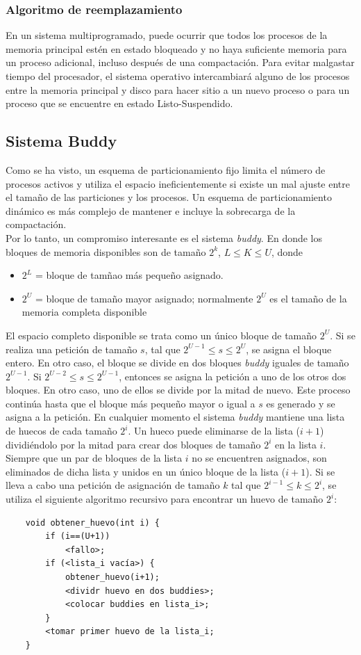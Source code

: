 \documentclass[12pt, a4paper]{article}
\begin{document}
\subsubsection{Algoritmo de reemplazamiento}
En un sistema multiprogramado, puede ocurrir que todos los procesos de la memoria principal estén en estado bloqueado y no haya suficiente memoria para un proceso adicional, incluso después de una compactación. Para evitar malgastar tiempo del procesador, el sistema operativo intercambiará alguno de los procesos entre la memoria principal y disco para hacer sitio a un nuevo proceso o para un proceso que se encuentre en estado Listo-Suspendido.
\subsection{Sistema Buddy}
Como se ha visto, un esquema de particionamiento fijo limita el número de procesos activos y utiliza el espacio ineficientemente si existe un mal ajuste entre el tamaño de las particiones y los procesos. Un esquema de particionamiento dinámico es más complejo de mantener e incluye la sobrecarga de la compactación. \\ 
Por lo tanto, un compromiso interesante es el sistema \textit{buddy}. En donde los bloques de memoria disponibles son de tamaño $2^k$, $L \leq K \leq U$, donde
\begin{itemize}
    \item $2^L$ = bloque de tamñao más pequeño asignado.
    \item $2^U$ = bloque de tamaño mayor asignado; normalmente $2^U$ es el tamaño de la memoria completa disponible
\end{itemize}
El espacio completo disponible se trata como un único bloque de tamaño $2^U$. Si se realiza una petición de tamaño $s$, tal que $2^{U-1}\le s \leq 2^U$, se asigna el bloque entero. En otro caso, el bloque se divide en dos bloques \textit{buddy} iguales de tamaño $2^{U-1}$. Si $2^{U-2}\le s \leq 2^{U-1}$, entonces se asigna la petición a uno de los otros dos bloques. En otro caso, uno de ellos se divide por la mitad de nuevo. Este proceso continúa hasta que el bloque más pequeño mayor o igual a $s$ es generado y se asigna a la petición. En cualquier momento el sistema \textit{buddy} mantiene una lista de huecos de cada tamaño $2^i$. Un hueco puede eliminarse de la lista ($i+1$) dividiéndolo por la mitad para crear dos bloques de tamaño $2^i$ en la lista $i$. Siempre que un par de bloques de la lista $i$ no se encuentren asignados, son eliminados de dicha lista y unidos en un único bloque de la lista ($i+1$). Si se lleva a cabo una petición de asignación de tamaño $k$ tal que $2^{i-1}\le k \leq 2^i$, se utiliza el siguiente algoritmo recursivo para encontrar un huevo de tamaño $2^i$:
\begin{verbatim}
    void obtener_huevo(int i) {
        if (i==(U+1))
            <fallo>;
        if (<lista_i vacía>) {
            obtener_huevo(i+1);
            <dividr huevo en dos buddies>;
            <colocar buddies en lista_i>;
        }
        <tomar primer huevo de la lista_i;
    }
\end{verbatim}
\end{document}
